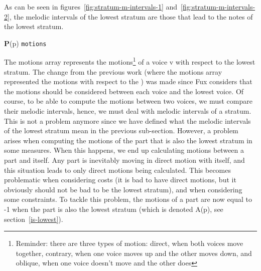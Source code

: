 As can be seen in figures~\ref{fig:stratum-m-intervals-1} and~\ref{fig:stratum-m-intervals-2}, the melodic intervals of the lowest stratum are those that lead to the notes of the lowest stratum.


\vspace{.5cm}
\noindent \textbf{P}(p) \hspace*{.2cm} \texttt{motions}

The motions array represents the motions\footnote{Reminder: there are three types of motion: direct, when both voices move together, contrary, when one voice moves up and the other moves down, and oblique, when one voice doesn't move and the other does} of a voice v with respect to the lowest stratum. The change from the previous work (where the motions array represented the motions with respect to the \cf) was made since Fux considers that the motions should be considered between each voice and the lowest voice. Of course, to be able to compute the motions between two voices, we must compare their melodic intervals, hence, we must deal with melodic intervals of a stratum. This is not a problem anymore since we have defined what the melodic intervals of the lowest stratum mean in the previous sub-section.
However, a problem arises when computing the motions of the part that is also the lowest stratum in some measures. When this happens, we end up calculating motions between a part and itself. Any part is inevitably moving in direct motion with itself, and this situation leads to only direct motions being calculated. This becomes problematic when considering costs (it is bad to have direct motions, but it obviously should not be bad to be the lowest stratum), and when considering some constraints. To tackle this problem, the motions of a part are now equal to -1 when the part is also the lowest stratum (which is denoted A(p), see section~\ref{is-lowest}). 

